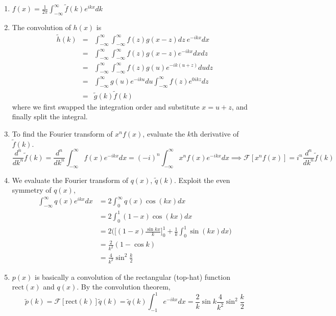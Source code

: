 \documentclass[a4paper]{article}
\begin{document}
\begin{ans}\leavevmode
\begin{enumerate}[label=(\alph*)]
\item $f(x)=\frac{1}{2\pi}\int_{-\infty}^\infty\tilde{f}(k)e^{ikx}dk$
\item The convolution of $h(x)$ is
\begin{eqnarray}
\tilde{h}(k)&=&\int_{-\infty}^\infty\int_{-\infty}^\infty f(z)g(x-z)dz~e^{-ikx}dx\nonumber\\&=&\int_{-\infty}^\infty\int_{-\infty}^\infty f(z)g(x-z)e^{-ikx}dxdz\nonumber\\&=&\int_{-\infty}^\infty\int_{-\infty}^\infty f(z)g(u)e^{-ik(u+z)}dudz\nonumber\\&=&\int_{-\infty}^\infty g(u)e^{-iku}du\int_{-\infty}^\infty f(z)e^{0ikz}dz\nonumber\\&=&\tilde{g}(k)\tilde{f}(k)\nonumber
\end{eqnarray}
where we first swapped the integration order and substitute $x=u+z$, and finally split the integral.
\item To find the Fourier transform of $x^nf(x)$, evaluate the $k$th derivative of $\tilde{f}(k)$.
$$\frac{d^n}{dk^n}\tilde{f}(k)=\frac{d^n}{dk^n}\int_{-\infty}^\infty f(x)e^{-ikx}dx=(-i)^n\int_{-\infty}^\infty x^nf(x)e^{-ikx}dx\implies\mathcal{F}[x^nf(x)]=i^n\frac{d^n}{dk^n}\tilde{f}(k)$$
\item We evaluate the Fourier transform of $q(x)$, $\tilde{q}(k)$. Exploit the even symmetry of $q(x)$,
\begin{align}
  \int_{-\infty}^\infty q(x)e^{ikx}dx&=2\int_0^\infty q(x)\cos(kx)dx\nonumber\\&=2\int_0^1(1-x)\cos(kx)dx\nonumber\\&=2\bigg(\bigg[(1-x)\frac{\sin kx}{k}\bigg]_0^1+\frac{1}{k}\int_0^1\sin(kx)dx\bigg)\nonumber\\&=\frac{2}{k^2}(1-\cos k)\nonumber\\&=\frac{4}{k^2}\sin^2\frac{k}{2}\nonumber  
\end{align}

\item $p(x)$ is basically a convolution of the rectangular (top-hat) function $\text{rect}(x)$ and $q(x)$. By the convolution theorem,
$$\tilde{p}(k)=\mathcal{F}[\text{rect}(k)]\tilde{q}(k)=\tilde{q}(k)\int_{-1}^1e^{-ikx}dx=\frac{2}{k}\sin k\frac{4}{k^2}\sin^2\frac{k}{2}$$
\end{enumerate}
\end{ans}
\newpage
\end{document}
